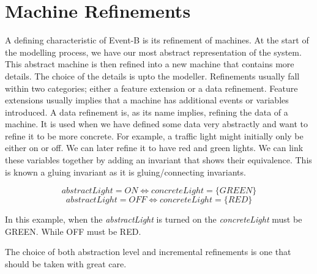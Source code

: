 \section{Machine Refinements}
A defining characteristic of Event-B is its refinement of machines. At the start of the modelling process, we have our most abstract representation of the system. This abstract machine is then refined into a new machine that contains more details. The choice of the details is upto the modeller. Refinements usually fall within two categories; either a feature extension or a data refinement. Feature extensions usually implies that a machine has additional events or variables introduced. A data refinement is, as its name implies, refining the data of a machine. It is used when we have defined some data very abstractly and want to refine it to be more concrete. For example, a traffic light might initially only be either on or off. We can later refine it to have red and green lights. We can link these variables together by adding an invariant that shows their equivalence. This is known a gluing invariant as it is gluing/connecting invariants.

$$ abstractLight = ON  \Leftrightarrow concreteLight = \{GREEN\} $$
$$ abstractLight = OFF \Leftrightarrow concreteLight = \{RED\}$$ 

In this example, when the \textit{abstractLight} is turned on the \textit{concreteLight} must be GREEN. While OFF must be {RED}.


The choice of both abstraction level and incremental refinements is one that should be taken with great care.
